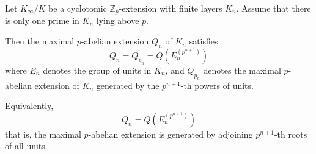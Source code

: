 Let $K_{\infty}/K$ be a cyclotomic $\mathbb{Z}_p$-extension with finite layers $K_n$. Assume that there is only one prime in $K_n$ lying above $p$.

Then the maximal $p$-abelian extension $Q_n$ of $K_n$ satisfies
$$Q_n = Q_{p_n} = Q(E_n^{(p^{n+1})})$$
where $E_n$ denotes the group of units in $K_n$, and $Q_{p_n}$ denotes the maximal $p$-abelian extension of $K_n$ generated by the $p^{n+1}$-th powers of units.

Equivalently,
$$Q_n = Q(E_n^{(p^{n+1})})$$
that is, the maximal $p$-abelian extension is generated by adjoining $p^{n+1}$-th roots of all units.

